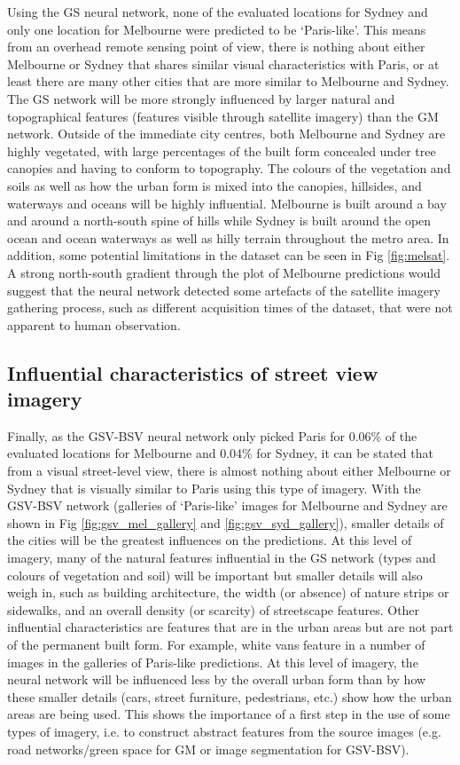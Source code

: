 \documentclass[10pt,letterpaper,hidelinks]{article}
\begin{document}
Using the GS neural network, none of the evaluated locations for Sydney and only one location for Melbourne were predicted to be `Paris-like'. This means from an overhead remote sensing point of view, there is nothing about either Melbourne or Sydney that shares similar visual characteristics with Paris, or at least there are many other cities that are more similar to Melbourne and Sydney. The GS network will be more strongly influenced by larger natural and topographical features (features visible through satellite imagery) than the GM network. Outside of the immediate city centres, both Melbourne and Sydney are highly vegetated, with large percentages of the built form concealed under tree canopies and having to conform to topography. The colours of the vegetation and soils as well as how the urban form is mixed into the canopies, hillsides, and waterways and oceans will be highly influential. Melbourne is built around a bay and around a north-south spine of hills while Sydney is built around the open ocean and ocean waterways as well as hilly terrain throughout the metro area. In addition, some potential limitations in the dataset can be seen in Fig \ref{fig:melsat}. A strong north-south gradient through the plot of Melbourne predictions would suggest that the neural network detected some artefacts of the satellite imagery gathering process, such as different acquisition times of the dataset, that were not apparent to human observation. 

\subsection*{Influential characteristics of street view imagery}

Finally, as the GSV-BSV neural network only picked Paris for 0.06\% of the evaluated locations for Melbourne and 0.04\% for Sydney, it can be stated that from a visual street-level view, there is almost nothing about either Melbourne or Sydney that is visually similar to Paris using this type of imagery. With the GSV-BSV network (galleries of `Paris-like' images for Melbourne and Sydney are shown in Fig \ref{fig:gsv_mel_gallery} and  \ref{fig:gsv_syd_gallery}), smaller details of the cities will be the greatest influences on the predictions. At this level of imagery, many of the natural features influential in the GS network (types and colours of vegetation and soil) will be important but smaller details will also weigh in, such as building architecture, the width (or absence) of nature strips or sidewalks, and an overall density (or scarcity) of streetscape features. Other influential characteristics are features that are in the urban areas but are not part of the permanent built form. For example, white vans feature in a number of images in the galleries of Paris-like predictions. At this level of imagery, the neural network will be influenced less by the overall urban form than by how these smaller details (cars, street furniture, pedestrians, etc.) show how the urban areas are being used. This shows the importance of a first step in the use of some types of imagery, i.e. to construct abstract features from the source images (e.g. road networks/green space for GM or image segmentation for GSV-BSV).
\end{document}
